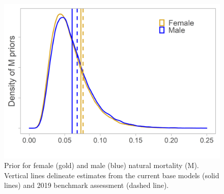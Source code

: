 \documentclass[11pt,
  english,
  a4paper,
]{article}
\begin{document}
\tagmcend\tagstructend


\begin{figure}
\centering
\includegraphics[width=1\textwidth,height=1\textheight]{figs/naturalmortalityprior.png}
\caption{Prior for female (gold) and male (blue) natural mortality (M). Vertical lines delineate estimates from the current base models (solid lines) and 2019 benchmark assessment (dashed line).\label{fig:naturalmortalityprior}}
\end{figure}

\tagmcend\tagstructend

\end{document}
